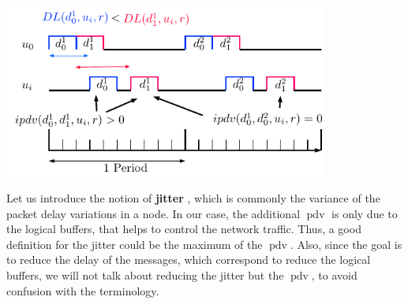 \documentclass[10pt]{article}
\DeclareMathOperator{\pdv}{pdv}
\begin{document}
\begin{center}
\includegraphics[width=0.8\textwidth]{ipdv}
  \end{center}
  
Let us introduce the notion of {\bf jitter} \cite{guillemin_peak_1992} , which is commonly the variance of the packet delay variations in a node. In our case, the additional $\pdv$ is only due to the logical buffers, that helps to control the network traffic. Thus, a good definition for the jitter could be the maximum of the $\pdv$. Also, since the goal is to reduce the delay of the messages, which correspond to reduce the logical buffers, we will not talk about reducing the jitter but the $\pdv$, to avoid confusion with the terminology.



\end{document}
